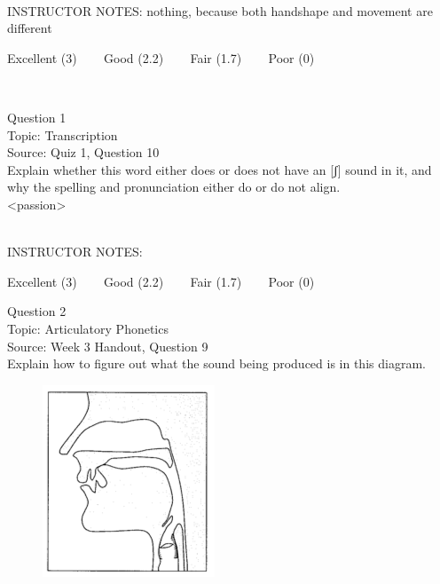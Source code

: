 \documentclass[12pt]{article}
\begin{document}
~\\
INSTRUCTOR NOTES: nothing, because both handshape and movement are different


\vfill
Excellent (3) ~~~ Good (2.2) ~~~ Fair (1.7) ~~~ Poor (0)
\newpage

\begin{center}
\textbf{{\color{red}{\HUGE END OF EXAM}}}\\

\end{center}
\newpage

\begin{center}
\textbf{{\color{blue}{\HUGE START OF EXAM\\}}}

\textbf{{\color{blue}{\HUGE Student ID: 99594\\}}}

\textbf{{\color{blue}{\HUGE \\}}}

\end{center}
\newpage

{\large Question 1}\\

Topic: Transcription\\
Source: Quiz 1, Question 10\\

Explain whether this word either does or does not have an [ʃ] sound in it, and why the spelling and pronunciation either do or do not align.\\

<passion>


~\\
INSTRUCTOR NOTES: 


\vfill
Excellent (3) ~~~ Good (2.2) ~~~ Fair (1.7) ~~~ Poor (0)
\newpage

{\large Question 2}\\

Topic: Articulatory Phonetics\\
Source: Week 3 Handout, Question 9\\

Explain how to figure out what the sound being produced is in this diagram.\\

\begin{figure}[H]
\includegraphics{../images/sagittal_t.png}
\end{figure}
\end{document}
